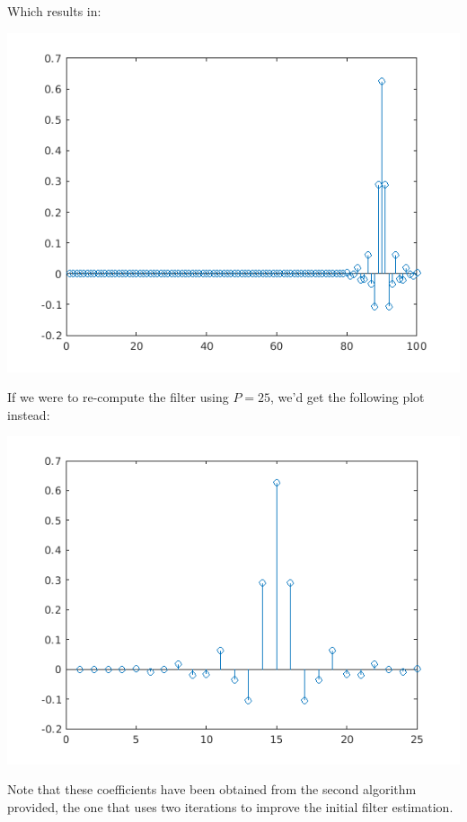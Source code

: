 \documentclass[conference,9pt]{IEEEtran}
\begin{document}
Which results in:

\includegraphics[scale=0.6]{coef.png}

If we were to re-compute the filter using $P=25$, we'd get the following plot instead:

\includegraphics[scale=0.6]{coef25.png}

Note that these coefficients have been obtained from the second algorithm provided, the one that uses two iterations to improve the initial filter estimation.
\end{document}
